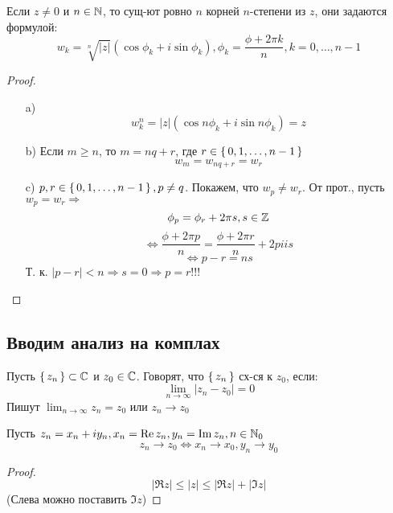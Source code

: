 \begin{lemma}
Если $z \neq 0$ и $n \in \mathbb{N}$, то сущ-ют ровно $n$ корней $n$-степени из $z$, они задаются формулой:
\[
w_k = \sqrt[n]{\left|z\right|}(\cos \phi_k + i\sin\phi_k), \phi_k = \frac{\phi + 2\pi k}{n}, k = 0, \ldots, n - 1
\]
\end{lemma}
\begin{proof}
  \begin{itemize}
    \item [a) ]
\[
w_k^{n} = \left|z\right|(\cos n\phi_k + i\sin n\phi_k) = z
\]
    \item [b) ] Если $m \geq n$, то $m = nq + r$, где $r \in \set{0, 1, \ldots, n - 1}$
      \[
      w_m = w_{nq + r} = w_r
      \]
    \item [c) ] $p, r \in \set{0, 1, \ldots, n - 1}, p \neq q$. Покажем, что $w_p \neq w_r$. От прот., пусть $w_p = w_r \Rightarrow$
      \[
        \phi_p = \phi_r + 2\pi s, s \in \mathbb{Z}
      \]
      \[
      \iff \frac{\phi + 2\pi p}{n} = \frac{\phi + 2\pi r}{n} + 2pii s
      \]
      \[
       \iff p - r = ns
      \]
      Т. к. $\left|p - r\right| < n \Rightarrow s = 0 \Rightarrow p = r!!!$
  \end{itemize}
\end{proof}
\subsection{Вводим анализ на комплах}
\begin{definition}
Пусть $\set{z_n} \subset \mathbb{C}$ и $z_0 \in \mathbb{C}$. Говорят, что $\set{z_n}$ сх-ся к $z_0$, если:
\[
\lim_{n\to\infty} \left|z_n - z_0\right| = 0
\]
Пишут $\lim_{n\to\infty} z_n = z_0$ или $z_n \rightarrow z_0$
\end{definition}
\begin{lemma}
Пусть $z_n = x_n + iy_n, x_n = \Re z_n, y_n = \Im z_n, n \in \mathbb{N}_0$
\[
z_n \rightarrow z_0 \iff x_n \rightarrow x_0, y_n \rightarrow y_0
\]
\end{lemma}
\begin{proof}
\[
\left|\Re z\right| \leq \left|z\right| \leq \left|\Re z\right| + \left|\Im z\right|
\]
(Слева можно поставить $\Im z$)
\end{proof}

